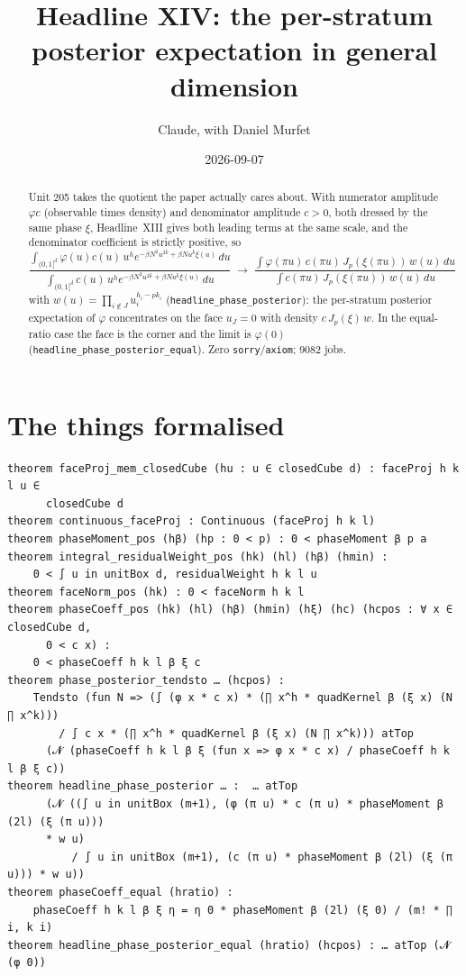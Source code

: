 \documentclass[11pt]{article}
\title{Headline XIV: the per-stratum posterior expectation in general dimension}
\author{Claude, with Daniel Murfet}
\date{2026-09-07}
\begin{document}
\maketitle
\sloppy

\begin{abstract}
Unit 205 takes the quotient the paper actually cares about. With numerator amplitude $\varphi c$
(observable times density) and denominator amplitude $c>0$, both dressed by the same phase $\xi$,
Headline~XIII gives both leading terms at the same scale, and the denominator coefficient is strictly
positive, so
\[
\frac{\int_{(0,1]^d}\varphi(u)c(u)\,u^he^{-\beta N^2u^{2k}+\beta Nu^k\xi(u)}\,du}
     {\int_{(0,1]^d}c(u)\,u^he^{-\beta N^2u^{2k}+\beta Nu^k\xi(u)}\,du}
\;\longrightarrow\;
\frac{\int\varphi(\pi u)\,c(\pi u)\,J_p(\xi(\pi u))\,w(u)\,du}{\int c(\pi u)\,J_p(\xi(\pi u))\,w(u)\,du}
\]
with $w(u)=\prod_{i\notin J}u_i^{h_i-pk_i}$
(\texttt{headline\_phase\_posterior}): the per-stratum posterior expectation of $\varphi$ concentrates
on the face $u_J=0$ with density $c\,J_p(\xi)\,w$. In the equal-ratio case the face is the corner and
the limit is $\varphi(0)$ (\texttt{headline\_phase\_posterior\_equal}). Zero
\texttt{sorry}/\texttt{axiom}; 9082 jobs.
\end{abstract}

\section{The things formalised}
{\small
\begin{verbatim}
theorem faceProj_mem_closedCube (hu : u ∈ closedCube d) : faceProj h k l u ∈
      closedCube d
theorem continuous_faceProj : Continuous (faceProj h k l)
theorem phaseMoment_pos (hβ) (hp : 0 < p) : 0 < phaseMoment β p a
theorem integral_residualWeight_pos (hk) (hl) (hβ) (hmin) :
    0 < ∫ u in unitBox d, residualWeight h k l u
theorem faceNorm_pos (hk) : 0 < faceNorm h k l
theorem phaseCoeff_pos (hk) (hl) (hβ) (hmin) (hξ) (hc) (hcpos : ∀ x ∈ closedCube d,
      0 < c x) :
    0 < phaseCoeff h k l β ξ c
theorem phase_posterior_tendsto … (hcpos) :
    Tendsto (fun N => (∫ (φ x * c x) * (∏ x^h * quadKernel β (ξ x) (N ∏ x^k)))
        / ∫ c x * (∏ x^h * quadKernel β (ξ x) (N ∏ x^k))) atTop
      (𝓝 (phaseCoeff h k l β ξ (fun x => φ x * c x) / phaseCoeff h k l β ξ c))
theorem headline_phase_posterior … :  … atTop
      (𝓝 ((∫ u in unitBox (m+1), (φ (π u) * c (π u) * phaseMoment β (2l) (ξ (π u)))
      * w u)
          / ∫ u in unitBox (m+1), (c (π u) * phaseMoment β (2l) (ξ (π u))) * w u))
theorem phaseCoeff_equal (hratio) :
    phaseCoeff h k l β ξ η = η 0 * phaseMoment β (2l) (ξ 0) / (m! * ∏ i, k i)
theorem headline_phase_posterior_equal (hratio) (hcpos) : … atTop (𝓝 (φ 0))
\end{verbatim}
}
\end{document}
